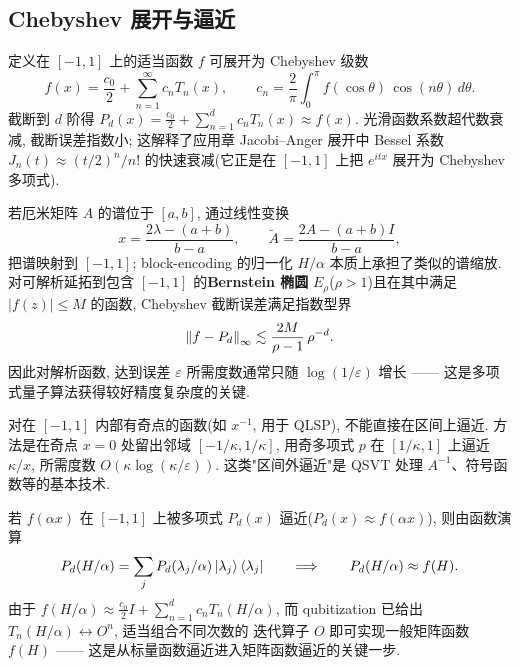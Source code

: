 \documentclass[utf8]{article} %
\numberwithin{equation}{section}   %
\newtheorem{Note}{\hskip 2em {\color{red} 注}}[subsection]
\begin{document}
\subsection{Chebyshev 展开与逼近}

\begin{Note}
    定义在 $[-1,1]$ 上的适当函数 $f$ 可展开为 Chebyshev 级数
    \begin{equation}
        f(x) = \frac{c_0}{2} + \sum_{n=1}^{\infty} c_n T_n(x),
        \qquad
        c_n = \frac{2}{\pi}\int_{0}^{\pi} f(\cos\theta)\,\cos(n\theta)\,d\theta.
    \end{equation}
    截断到 $d$ 阶得 $P_d(x) = \frac{c_0}{2} + \sum_{n=1}^{d} c_n T_n(x) \approx f(x)$.
    光滑函数系数超代数衰减, 截断误差指数小; 这解释了应用章 Jacobi--Anger 展开中
    Bessel 系数 $J_n(t) \approx (t/2)^n/n!$ 的快速衰减(它正是在 $[-1,1]$ 上把 $e^{itx}$
    展开为 Chebyshev 多项式).
\end{Note}

\begin{Note}[一般谱区间与截断误差]
    若厄米矩阵 $A$ 的谱位于 $[a,b]$, 通过线性变换
    \begin{equation}
        x = \frac{2\lambda - (a+b)}{b-a},
        \qquad
        \widetilde A = \frac{2A - (a+b)I}{b-a},
    \end{equation}
    把谱映射到 $[-1,1]$; block-encoding 的归一化 $H/\alpha$ 本质上承担了类似的谱缩放.
    对可解析延拓到包含 $[-1,1]$ 的\textbf{Bernstein 椭圆} $E_\rho$($\rho > 1$)且在其中满足
    $|f(z)| \le M$ 的函数, Chebyshev 截断误差满足指数型界
    \begin{equation}
        \norm{f - P_d}_\infty \lesssim \frac{2M}{\rho - 1}\,\rho^{-d}.
    \end{equation}
    因此对解析函数, 达到误差 $\varepsilon$ 所需度数通常只随 $\log(1/\varepsilon)$ 增长 ——
    这是多项式量子算法获得较好精度复杂度的关键.
\end{Note}

\begin{Note}
    对在 $[-1,1]$ 内部有奇点的函数(如 $x^{-1}$, 用于 QLSP), 不能直接在区间上逼近.
    方法是在奇点 $x=0$ 处留出邻域 $[-1/\kappa, 1/\kappa]$, 用奇多项式 $p$ 在
    $[1/\kappa,1]$ 上逼近 $\kappa/x$, 所需度数 $O(\kappa\log(\kappa/\varepsilon))$.
    这类"区间外逼近"是 QSVT 处理 $A^{-1}$、符号函数等的基本技术.
\end{Note}

\begin{Note}
    若 $f(\alpha x)$ 在 $[-1,1]$ 上被多项式 $P_d(x)$ 逼近($P_d(x) \approx f(\alpha x)$),
    则由函数演算
    \begin{equation}
        P_d(H/\alpha) = \sum_j P_d(\lambda_j/\alpha)\ket{\lambda_j}\bra{\lambda_j}
        \qquad\Longrightarrow\qquad
        P_d(H/\alpha) \approx f(H).
    \end{equation}
    由于 $f(H/\alpha) \approx \frac{c_0}{2}I + \sum_{n=1}^{d} c_n T_n(H/\alpha)$,
    而 qubitization 已给出 $T_n(H/\alpha) \leftrightarrow O^n$, 适当组合不同次数的
    迭代算子 $O$ 即可实现一般矩阵函数 $f(H)$ —— 这是从标量函数逼近进入矩阵函数逼近的关键一步.
\end{Note}
\end{document}

